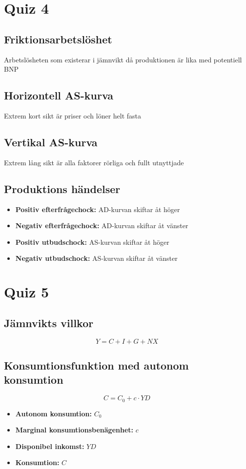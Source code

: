 \documentclass[12pt,a4paper]{article}
\begin{document}
\section{Quiz 4}
\subsection{Friktionsarbetslöshet}
Arbetslösheten som existerar i jämnvikt då produktionen är lika med potentiell BNP

\subsection{Horizontell AS-kurva}
Extrem kort sikt är priser och löner helt fasta

\subsection{Vertikal AS-kurva}
Extrem lång sikt är alla faktorer rörliga och fullt utnyttjade

\subsection{Produktions händelser}
\begin{itemize}
    \item \textbf{Positiv efterfrågechock: }AD-kurvan skiftar åt höger
    \item \textbf{Negativ efterfrågechock: }AD-kurvan skiftar åt vänster
    \item \textbf{Positiv utbudschock: }AS-kurvan skiftar åt höger
    \item \textbf{Negativ utbudschock: }AS-kurvan skiftar åt vänster
\end{itemize}

\section{Quiz 5}
\subsection{Jämnvikts villkor}
\[
Y = C + I + G + NX
\]
\subsection{Konsumtionsfunktion med autonom konsumtion}
\[
C = C_0 + c \cdot YD
\]
\begin{itemize}
    \item \textbf{Autonom konsumtion: }$C_0$
    \item \textbf{Marginal konsumtionsbenägenhet: }$c$
    \item \textbf{Disponibel inkomst: }$YD$
    \item \textbf{Konsumtion: }$C$
\end{itemize}
\end{document}
